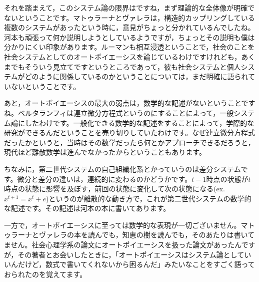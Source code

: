 \documentclass{ltjsbook}
\begin{document}
それを踏まえて，このシステム論の限界はですね，まず理論的な全体像が明確でないということです。マトゥラーナとヴァレラは，構造的カップリングしている複数のシステムがあったという時に，意見がちょっと分かれているんでしたね。河本も頑張って何か説明しようとしているようですが，ちょっとその説明も僕は分かりにくい印象があります。ルーマンも相互浸透ということで，社会のことを社会システムとしてのオートポイエーシスを論じているわけですけれども，あくまでもそういう見立てですというところであって，彼も社会システムと個人システムがどのように関係しているのかということについては，まだ明確に語られていないということです。

あと，オートポイエーシスの最大の弱点は，数学的な記述がないということですね。ベルタランフィは連立微分方程式というのにすることによって，一般システム論にしたわけです。一般化できる数学的な記述をすることによって，学際的な研究ができるんだということを売り切りしていたわけです。なぜ連立微分方程式だったかというと，当時はその数学だったら何とかアプローチできるだろうと，現代ほど離散数学は進んでなかったからということもあります。

ちなみに，第二世代システムの自己組織化系とかっていうのは差分システムです。微分と差分の違いは，連続的に変わるのかどうかです。$t-1$時点の状態が$t$時点の状態に影響を及ぼす，前回の状態に変化して次の状態になる(ex.$x^{t+1}=x^t+e$)というのが離散的な動き方で，これが第二世代システムの数学的な記述です。その記述は河本の本\parencite{KawamotoHideo}に書いてあります。

一方で，オートポイエーシスに至っては数学的な表現が一切ございません。マトゥラーナとヴァレラの本を読んでも，知恵の樹を読んでも，そのあたりは書いてません。社会心理学系の論文にオートポイエーシスを扱った論文\parencite{NomuraTatsuya}があったんですが，その著者とお会いしたときに，「オートポイエーシスはシステム論としていいんだけど，数式で書いてくれないから困るんだ」みたいなことをすごく語っておられたのを覚えてます。
\end{document}
